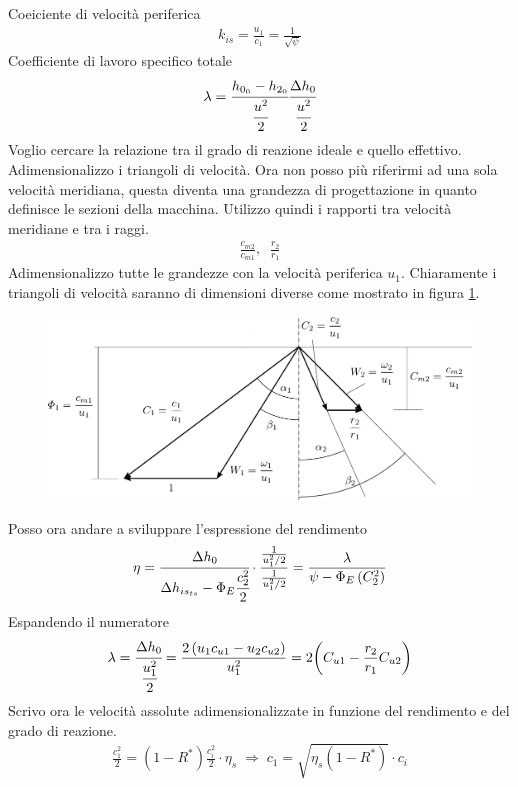 Coeiciente di velocità periferica
\begin{align*}
k_{is} = \frac{u_1}{c_1} = \frac{1}{\sqrt{\psi}}
\end{align*}
Coefficiente di lavoro specifico totale
\begin{align*}
\lambda = \cfrac{h_{0_0} - h_{2_0}}{\cfrac{u^2}{2}} \cfrac{\Delta h_0}{\cfrac{u^2}{2}}
\end{align*}
Voglio cercare la relazione tra il grado di reazione ideale e quello effettivo. Adimensionalizzo i triangoli di velocità. Ora non posso più riferirmi ad una sola velocità meridiana, questa diventa una grandezza di progettazione in quanto definisce le sezioni della macchina. Utilizzo quindi i rapporti tra velocità meridiane e tra i raggi.
\begin{align*}
\frac{c_{m2}}{c_{m1}}, \;\; \frac{r_2}{r_1}
\end{align*}
Adimensionalizzo tutte le grandezze con la velocità periferica $u_1$. Chiaramente i triangoli di velocità saranno di dimensioni diverse come mostrato in figura \ref{fig:triangTurb}. 
\begin{figure}[h!]
\centering
  \includegraphics[width=.8\textwidth]{fig/triangTurb.pdf}
\caption{}
\label{fig:triangTurb}
\end{figure}
Posso ora andare a sviluppare l'espressione del rendimento
\begin{equation}
\eta = \cfrac{\Delta h_0}{\Delta h_{is_{ts}} - \Phi_E \cfrac{c_2^2}{2}} \cdot \frac{\frac{1}{u_1^2/2}}{\frac{1}{u_1^2/2}} = \frac{\lambda}{\psi - \Phi_E \left( C_2^2 \right)}
\end{equation}
Espandendo il numeratore
\begin{align*}
\lambda = \cfrac{\Delta h_0}{\cfrac{u_1^2}{2}} = \frac{2 \left( u_1 c_{u1} - u_2 c_{u2} \right)}{u_1^2} = 2 \bigg( C_{u1} - \frac{r_2}{r_1} C_{u2} \bigg)
\end{align*}
Scrivo ora le velocità assolute adimensionalizzate in funzione del rendimento e del grado di reazione. 
\begin{align*}
\frac{c_1^2}{2} = \left( 1 - R^* \right) \frac{c_i^2}{2} \cdot \eta_s \; \Rightarrow \; c_1 = \sqrt{\eta_s \left( 1 - R^* \right)} \cdot c_i
\end{align*}
